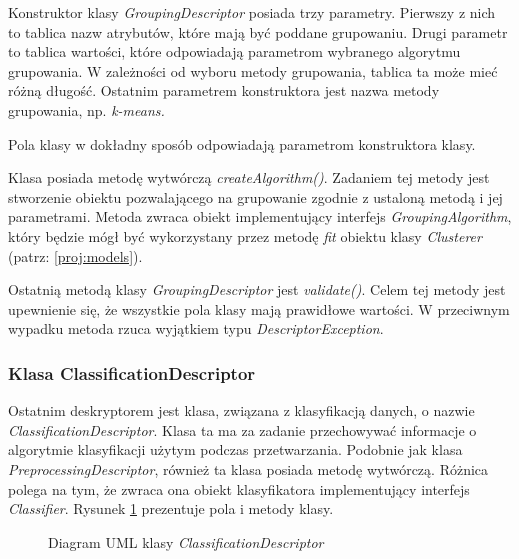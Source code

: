 \documentclass[../thesis.tex]{subfiles}
\begin{document}
Konstruktor klasy \emph{GroupingDescriptor} posiada trzy parametry. Pierwszy z nich to tablica nazw atrybutów, które mają być poddane grupowaniu. Drugi parametr to tablica wartości, które odpowiadają parametrom wybranego algorytmu grupowania. W zależności od wyboru metody grupowania, tablica ta może mieć różną długość. Ostatnim parametrem konstruktora jest nazwa metody grupowania, np. \emph{k-means.}

Pola klasy w dokładny sposób odpowiadają parametrom konstruktora klasy.

Klasa posiada metodę wytwórczą \emph{createAlgorithm()}. Zadaniem tej metody jest stworzenie obiektu pozwalającego na grupowanie zgodnie z ustaloną metodą i jej parametrami. Metoda zwraca obiekt implementujący interfejs \emph{GroupingAlgorithm}, który będzie mógł być wykorzystany przez metodę \emph{fit} obiektu klasy \emph{Clusterer} (patrz: \ref{proj:models}).

Ostatnią metodą klasy \emph{GroupingDescriptor} jest \emph{validate()}. Celem tej metody jest upewnienie się, że wszystkie pola klasy mają prawidłowe wartości. W przeciwnym wypadku metoda rzuca wyjątkiem typu \emph{DescriptorException}.

\subsubsection{Klasa ClassificationDescriptor}

Ostatnim deskryptorem jest klasa, związana z klasyfikacją danych, o nazwie \emph{ClassificationDescriptor}. Klasa ta ma za zadanie przechowywać informacje o algorytmie klasyfikacji użytym podczas przetwarzania. Podobnie jak klasa \emph{PreprocessingDescriptor}, również ta klasa posiada metodę wytwórczą. Różnica polega na tym, że zwraca ona obiekt klasyfikatora implementujący interfejs \emph{Classifier}. Rysunek \ref{proj:diagram_classification_descriptor} prezentuje pola i metody klasy.

\begin{figure}[h]
\centering
{}
\caption{Diagram UML klasy \emph{ClassificationDescriptor}}
\label{proj:diagram_classification_descriptor}
\end{figure}
\end{document}
